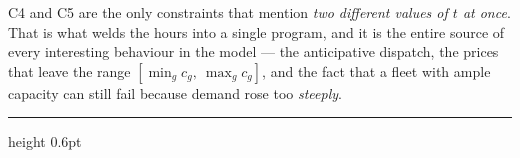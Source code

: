 \documentclass[11pt]{article}
\begin{document}
C4 and C5 are the only constraints that mention \emph{two different values of $t$ at once}.
That is what welds the hours into a single program, and it is the entire source of every
interesting behaviour in the model --- the anticipative dispatch, the prices that leave the
range $[\min_g c_g,\ \max_g c_g]$, and the fact that a fleet with ample capacity can still fail
because demand rose too \emph{steeply}.

\vspace{1.4em}
\noindent\textcolor{rule}{\hrule height 0.6pt}
\vspace{0.5em}
\end{document}

